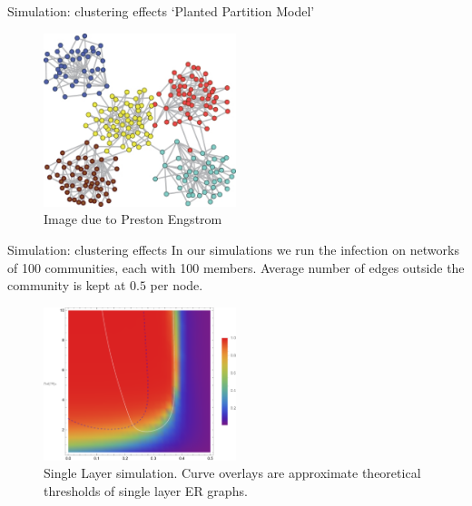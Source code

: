 \documentclass[10pt, xcolor=dvipsnames, handout]{beamer}
\begin{document}
\begin{frame}{Simulation: clustering effects}
`Planted Partition Model'
\begin{figure}
\centering
\includegraphics[width=0.5\textwidth]{figures/communities}
\caption{Image due to Preston Engstrom}
\end{figure}
\end{frame}

\begin{frame}{Simulation: clustering effects}
In our simulations we run the infection on networks of 100 communities, each with 100 members. Average number of edges outside the community is kept at $0.5$ per node.

\begin{figure}
\centering
\includegraphics[width=0.5\textwidth]{figures/pp_single_with_er_cascade_overlay}
\caption{Single Layer simulation. Curve overlays are approximate theoretical thresholds of single layer ER graphs.}
\end{figure}
\end{frame}
\end{document}
